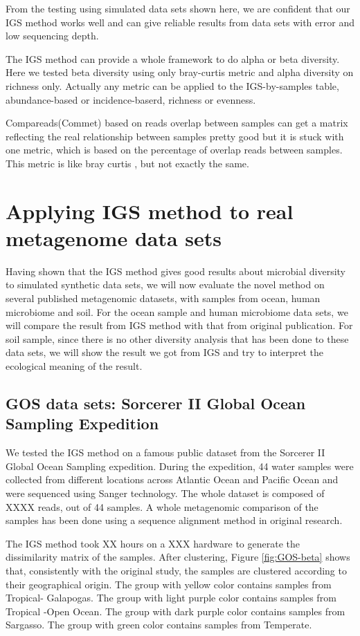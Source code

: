 \documentclass{article}
\begin{document}
From the testing using simulated data sets shown here, we are confident that our IGS method works well and can give reliable results from data sets with error and low sequencing depth.

The IGS method can provide a whole framework to do alpha or beta diversity. Here we tested beta diversity using only bray-curtis metric and alpha diversity on richness only. Actually any metric can be applied to the IGS-by-samples table, abundance-based or incidence-baserd, richness or evenness.

Compareads(Commet) based on reads overlap between samples can get a matrix reflecting the real relationship between samples pretty good but it is stuck with one metric, which is based on the percentage of overlap reads between samples. This metric is like bray curtis , but not exactly the same.



\section{Applying IGS method to real metagenome data sets}

Having shown that the IGS method gives good results about microbial diversity to simulated synthetic data sets, 
we will now evaluate the novel method on several published metagenomic datasets, with samples 
from ocean, human microbiome and soil. For the ocean sample and human microbiome data sets, we will compare the result from IGS method
with that from original publication. For soil sample, since there is no other diversity analysis that has been done
to these data sets, we will show the result we got from IGS and try to interpret the ecological meaning of the result.


\subsection{GOS data sets: Sorcerer II Global Ocean Sampling Expedition}

We tested the IGS method on a famous public dataset from the Sorcerer II Global Ocean Sampling expedition.
During the expedition, 44 water samples were collected from different locations across
Atlantic Ocean and Pacific Ocean and were sequenced using Sanger technology. The whole dataset is composed of XXXX reads, out of 44 samples.
A whole metagenomic comparison of the samples has been done
using a sequence alignment method in original research. 

The IGS method took XX hours on a XXX hardware to generate the dissimilarity matrix of the samples. After clustering, 
Figure \ref{fig:GOS-beta} shows that, consistently with the original study, the samples are clustered according to their 
geographical origin. The group with yellow color contains samples from Tropical- Galapogas. The group with light purple color
contains samples from Tropical -Open Ocean. The group with dark purple color contains samples from Sargasso. The group 
with green color contains samples from Temperate. 
\end{document}
